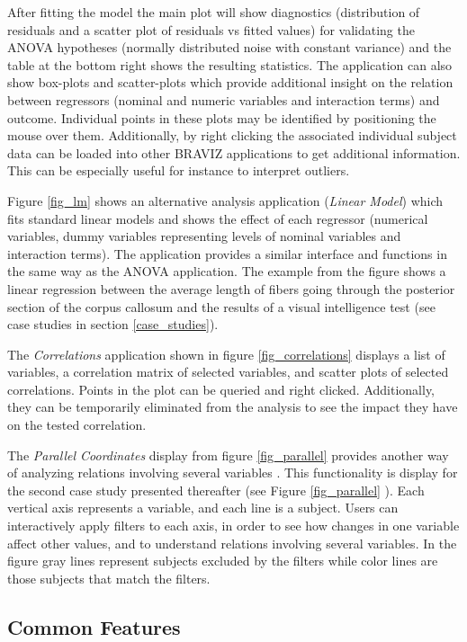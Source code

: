 \documentclass{frontiersHLTH}
\begin{document}
After fitting the model the main plot will show diagnostics (distribution of residuals and a scatter plot of residuals vs fitted values) for validating the ANOVA hypotheses (normally distributed noise with constant variance) and the table at the bottom right shows the resulting statistics. The application can also show box-plots and scatter-plots which provide additional insight on the relation between regressors (nominal and numeric variables and interaction terms) and outcome. Individual points in these plots may be identified by positioning the mouse over them. Additionally, by right clicking the associated individual subject data can be loaded into other BRAVIZ applications to get additional information. This can be especially useful for instance to interpret outliers.

Figure \ref{fig_lm} shows an alternative analysis application (\emph{Linear Model}) which fits standard linear models and shows the effect of each regressor (numerical variables, dummy variables representing levels of nominal variables and interaction terms). The application provides a similar interface and functions in the same way as the ANOVA application. The example from the figure shows a linear regression between the average length of fibers going through the posterior section of the corpus callosum and the results of a visual intelligence test (see case studies in section \ref{case_studies}).  

The \emph{Correlations} application shown in figure \ref{fig_correlations} displays a list of variables, a correlation matrix of selected variables, and scatter plots of selected correlations. Points in the plot can be queried and right clicked. Additionally, they can be temporarily eliminated from the analysis to see the impact they have on the tested correlation. 

The \emph{Parallel Coordinates} display from figure \ref{fig_parallel} provides another way of analyzing relations involving several variables . This functionality is display for the second case study presented thereafter (see Figure \ref{fig_parallel} ). Each vertical axis represents a variable, and each line is a subject. Users can interactively apply filters to each axis, in order to see how changes in one variable affect other values, and to understand relations involving several variables. In the figure gray lines represent subjects excluded by the filters while color lines are those subjects that match the filters.

\subsection{Common Features}
\end{document}
